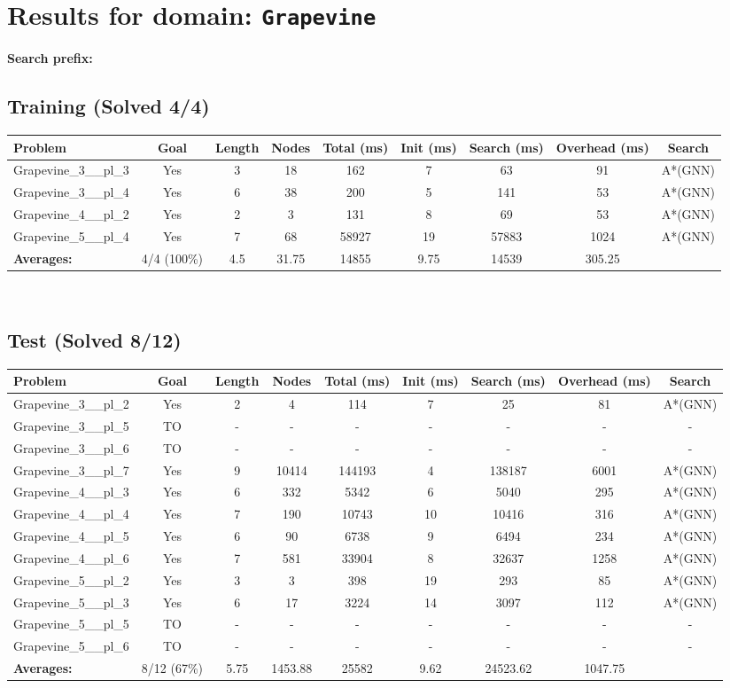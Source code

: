 \documentclass{article}
\begin{document}
\section*{Results for domain: \texttt{Grapevine}}
\textbf{Search prefix:} 
\\[0.5cm]
\subsection*{Training (Solved 4/4)}
\begin{tabular}{lcccccccc}
\toprule
Problem & Goal & Length & Nodes & Total (ms) & Init (ms) & Search (ms) & Overhead (ms) & Search \\
\midrule
Grapevine\_3\_\_pl\_3 & Yes & 3 & 18 & 162 & 7 & 63 & 91 & A*(GNN) \\
Grapevine\_3\_\_pl\_4 & Yes & 6 & 38 & 200 & 5 & 141 & 53 & A*(GNN) \\
Grapevine\_4\_\_pl\_2 & Yes & 2 & 3 & 131 & 8 & 69 & 53 & A*(GNN) \\
Grapevine\_5\_\_pl\_4 & Yes & 7 & 68 & 58927 & 19 & 57883 & 1024 & A*(GNN) \\
\textbf{Averages:} & 4/4 (100\%) & 4.5 & 31.75 & 14855 & 9.75 & 14539 & 305.25 & \\
\bottomrule
\end{tabular}
\\[0.7cm]
\subsection*{Test (Solved 8/12)}
\begin{tabular}{lcccccccc}
\toprule
Problem & Goal & Length & Nodes & Total (ms) & Init (ms) & Search (ms) & Overhead (ms) & Search \\
\midrule
Grapevine\_3\_\_pl\_2 & Yes & 2 & 4 & 114 & 7 & 25 & 81 & A*(GNN) \\
Grapevine\_3\_\_pl\_5 & TO & - & - & - & - & - & - & - \\
Grapevine\_3\_\_pl\_6 & TO & - & - & - & - & - & - & - \\
Grapevine\_3\_\_pl\_7 & Yes & 9 & 10414 & 144193 & 4 & 138187 & 6001 & A*(GNN) \\
Grapevine\_4\_\_pl\_3 & Yes & 6 & 332 & 5342 & 6 & 5040 & 295 & A*(GNN) \\
Grapevine\_4\_\_pl\_4 & Yes & 7 & 190 & 10743 & 10 & 10416 & 316 & A*(GNN) \\
Grapevine\_4\_\_pl\_5 & Yes & 6 & 90 & 6738 & 9 & 6494 & 234 & A*(GNN) \\
Grapevine\_4\_\_pl\_6 & Yes & 7 & 581 & 33904 & 8 & 32637 & 1258 & A*(GNN) \\
Grapevine\_5\_\_pl\_2 & Yes & 3 & 3 & 398 & 19 & 293 & 85 & A*(GNN) \\
Grapevine\_5\_\_pl\_3 & Yes & 6 & 17 & 3224 & 14 & 3097 & 112 & A*(GNN) \\
Grapevine\_5\_\_pl\_5 & TO & - & - & - & - & - & - & - \\
Grapevine\_5\_\_pl\_6 & TO & - & - & - & - & - & - & - \\
\textbf{Averages:} & 8/12 (67\%) & 5.75 & 1453.88 & 25582 & 9.62 & 24523.62 & 1047.75 & \\
\bottomrule
\end{tabular}
\\[0.7cm]
\end{document}
